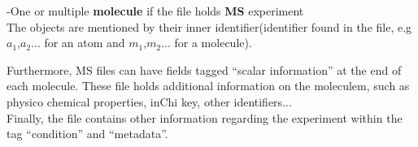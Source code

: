-One or multiple \textbf{molecule} if the file holds \textbf{MS} experiment\\
The objects are mentioned by their inner identifier(identifier found in the file, e.g $a_1$,$a_2$... for an atom and $m_1$,$m_2$... for a molecule).

Furthermore, MS files can have fields tagged ``scalar information'' at the end of each molecule. These file holds additional information on the moleculem, such as physico chemical properties, inChi key, other identifiers...\\
Finally, the file contains other information regarding the experiment within the tag ``condition'' and ``metadata''.



\clearpage
